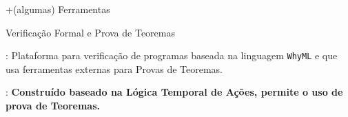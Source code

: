 \begin{frame}{+(algumas) Ferramentas}\small
\begin{block}{Verificação Formal e Prova de Teoremas}
      \begin{description}
      \item<1,3>[\href{http://why3.lri.fr/}{Why3}]: Plataforma para
        verificação de programas baseada na linguagem {\tt WhyML} e
        que usa ferramentas externas para Provas de Teoremas.
        \item<2,3>[\href{https://lamport.azurewebsites.net/tla/tla.html}{TLA$^+$}]: {\bf Construído
        baseado na Lógica Temporal de Ações, permite o uso de prova de Teoremas.}
      \end{description}
    \end{block}
\end{frame}